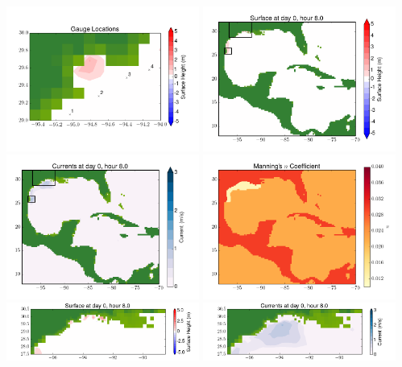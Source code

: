 \documentclass[11pt]{article}
\begin{document}
\includegraphics[width=0.475\textwidth]{frame0079fig10.png}
\vskip 10pt 
\includegraphics[width=0.475\textwidth]{frame0080fig1.png}
\includegraphics[width=0.475\textwidth]{frame0080fig2.png}
\vskip 10pt 
\includegraphics[width=0.475\textwidth]{frame0080fig3.png}
\includegraphics[width=0.475\textwidth]{frame0080fig4.png}
\vskip 10pt 
\includegraphics[width=0.475\textwidth]{frame0080fig5.png}
\end{document}
